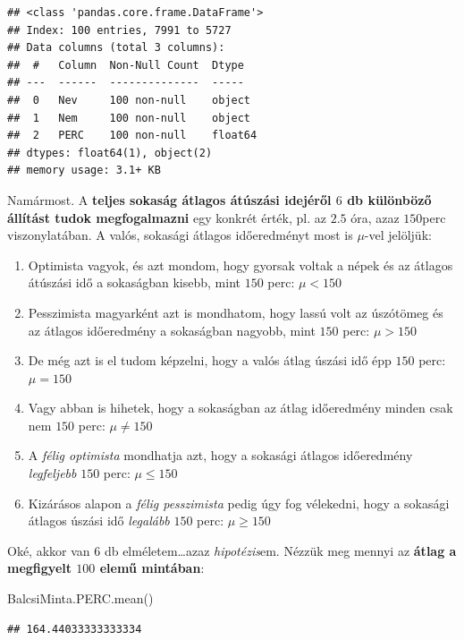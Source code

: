 \documentclass[
]{book}
\newenvironment{Shaded}{\begin{snugshade}}{\end{snugshade}}
\newcommand{\NormalTok}[1]{#1}
\providecommand{\tightlist}{%
  \setlength{\itemsep}{0pt}\setlength{\parskip}{0pt}}
\begin{document}
\begin{verbatim}
## <class 'pandas.core.frame.DataFrame'>
## Index: 100 entries, 7991 to 5727
## Data columns (total 3 columns):
##  #   Column  Non-Null Count  Dtype  
## ---  ------  --------------  -----  
##  0   Nev     100 non-null    object 
##  1   Nem     100 non-null    object 
##  2   PERC    100 non-null    float64
## dtypes: float64(1), object(2)
## memory usage: 3.1+ KB
\end{verbatim}

Namármost. A \textbf{teljes sokaság átlagos átúszási idejéről \(6\) db különböző állítást tudok megfogalmazni} egy konkrét érték, pl. az \(2.5\) óra, azaz \(150\)perc viszonylatában. A valós, sokasági átlagos időeredményt most is \(\mu\)-vel jelöljük:

\begin{enumerate}
\def\labelenumi{\arabic{enumi}.}
\tightlist
\item
  Optimista vagyok, és azt mondom, hogy gyorsak voltak a népek és az átlagos átúszási idő a sokaságban kisebb, mint \(150\) perc: \(\mu < 150\)
\item
  Pesszimista magyarként azt is mondhatom, hogy lassú volt az úszótömeg és az átlagos időeredmény a sokaságban nagyobb, mint \(150\) perc: \(\mu > 150\)
\item
  De még azt is el tudom képzelni, hogy a valós átlag úszási idő épp \(150\) perc: \(\mu = 150\)
\item
  Vagy abban is hihetek, hogy a sokaságban az átlag időeredmény minden csak nem \(150\) perc: \(\mu \neq 150\)
\item
  A \emph{félig optimista} mondhatja azt, hogy a sokasági átlagos időeredmény \emph{legfeljebb} \(150\) perc: \(\mu \leq 150\)
\item
  Kizárásos alapon a \emph{félig pesszimista} pedig úgy fog vélekedni, hogy a sokasági átlagos úszási idő \emph{legalább} \(150\) perc: \(\mu \geq 150\)
\end{enumerate}

Oké, akkor van \(6\) db elméletem\ldots azaz \emph{hipotézis}em. Nézzük meg mennyi az \textbf{átlag a megfigyelt \(100\) elemű mintában}:

\begin{Shaded}
\begin{Highlighting}[]
\NormalTok{BalcsiMinta.PERC.mean()}
\end{Highlighting}
\end{Shaded}

\begin{verbatim}
## 164.44033333333334
\end{verbatim}
\end{document}
